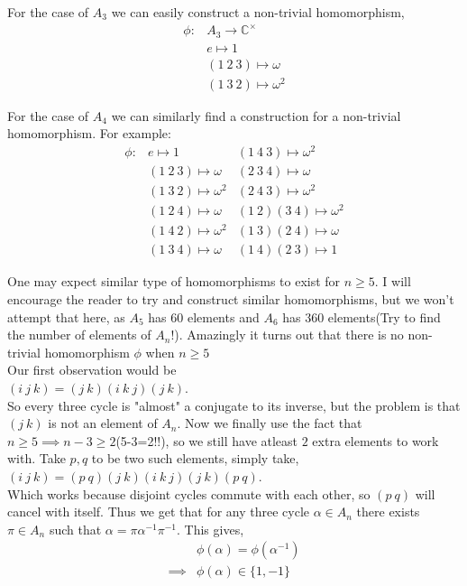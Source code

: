 For the case of $A_3$ we can easily construct a non-trivial homomorphism, 
\begin{align*}
\phi:&A_3\rightarrow\mathbb{C}^{\times}\\
&e\mapsto 1\\
&(1\ 2\ 3)\mapsto\omega\\
&(1\ 3\ 2)\mapsto\omega^2
\end{align*}

For the case of $A_4$ we can similarly find a construction for a non-trivial homomorphism. For example:
\begin{align*}
\phi:&e\mapsto 1 &(1\ 4\ 3)\mapsto\omega^2\\
&(1\ 2\ 3)\mapsto\omega &(2\ 3\ 4)\mapsto\omega\\
&(1\ 3\ 2)\mapsto\omega^2 &(2\ 4\ 3)\mapsto\omega^2\\
&(1\ 2\ 4)\mapsto\omega &(1\ 2)(3\ 4)\mapsto\omega^2\\
&(1\ 4\ 2)\mapsto\omega^2 &(1\ 3)(2\ 4)\mapsto\omega\\
&(1\ 3\ 4)\mapsto\omega &(1\ 4)(2\ 3)\mapsto 1
\end{align*}

One may expect similar type of homomorphisms to exist for $n\geq 5$. I will encourage the reader to try and construct similar homomorphisms, but we won't attempt that here, as $A_5$ has $60$ elements and $A_6$ has $360$ elements(Try to find the number of elements of $A_n$!). Amazingly it turns out that there is no non-trivial homomorphism $\phi$ when $n\geq 5$\\

Our first observation would be\\ 
$(i\ j\ k)=(j\ k)(i\ k\ j)(j\ k)$.\\
So every three cycle is "almost" a conjugate to its inverse, but the problem is that $(j\ k)$ is not an element of $A_n$. Now we finally use the fact that $n\geq 5\implies n-3\geq 2$(5-3=2!!), so we still have atleast $2$ extra elements to work with. Take $p,q$ to be two such elements, simply take,\\
$(i\ j\ k)=(p\ q)(j\ k)(i\ k\ j)(j\ k)(p\ q)$.\\
Which works because disjoint cycles commute with each other, so $(p\ q)$ will cancel with itself. Thus we get that for any three cycle $\alpha\in A_n$ there exists $\pi\in A_n$ such that $\alpha=\pi\alpha^{-1}\pi^{-1}$. This gives,
\begin{align*}
&\phi(\alpha)=\phi(\alpha^{-1})\\
\implies&\phi(\alpha)\in\{1,-1\}
\end{align*}

